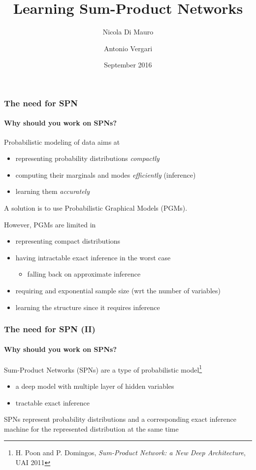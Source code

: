 \documentclass[10pt, t, xcolor={usenames,dvipsnames,svgnames}, compress]{beamer}
\title{Learning Sum-Product Networks}
\author{Nicola Di Mauro \and Antonio Vergari}
\date{September 2016}
\institute{Università degli Studi di Bari}
\begin{document}
\begin{frame}[c]
  \titlepage
\end{frame}

\begin{frame}
\frametitle{The need for SPN}
  \framesubtitle{Why should you work on SPNs?}

Probabilistic modeling of data aims at
\begin{itemize}
  \item representing probability distributions \emph{compactly}
  \item computing their marginals and modes \emph{efficiently} (inference)
  \item learning them \emph{accurately}
\end{itemize}
A solution is to use Probabilistic Graphical Models (PGMs).

However, PGMs are limited in
\begin{itemize}
\item representing compact distributions
\item having intractable exact inference in the worst case 
  \begin{itemize}
  \item falling back on approximate inference
  \end{itemize}
\item requiring and exponential sample size (wrt the number of variables)
\item learning the structure since it requires inference
\end{itemize}
\end{frame}

\begin{frame}
\frametitle{The need for SPN (II)}
  \framesubtitle{Why should you work on SPNs?}

Sum-Product Networks (SPNs) are a type of probabilistic model\footnote{H. Poon
  and P. Domingos, \emph{Sum-Product Network: a New Deep Architecture}, UAI 2011}
\begin{itemize}
\item a deep model with multiple layer of hidden variables
\item tractable exact inference 
\end{itemize}
SPNs represent probability distributions and a corresponding exact inference
machine for the represented distribution at the same time 
\end{frame}
\end{document}
